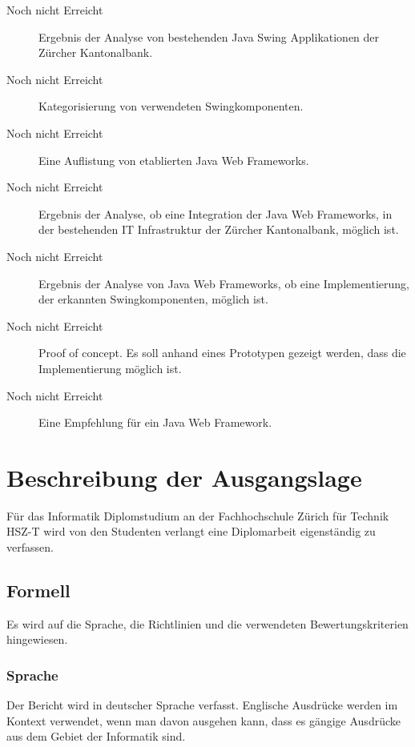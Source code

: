 \documentclass[
11pt, %
a4paper, %
BCOR25mm, %
DIV14, %
footsepline = false, %
headsepline, %
twoside, %
openright,
abstracton, %
listof=totocnumbered, %
bibliography=totocnumbered %
]{scrreprt}
\begin{document}
  \begin{description}
    \item [Noch nicht Erreicht] Ergebnis der Analyse von bestehenden Java Swing
    Applikationen der Zürcher Kantonalbank.
    \item [Noch nicht Erreicht] Kategorisierung von verwendeten
    Swingkomponenten.
    \item [Noch nicht Erreicht] Eine Auflistung von etablierten Java Web
    Frameworks.
    \item [Noch nicht Erreicht] Ergebnis der Analyse, ob eine Integration der
    Java Web Frameworks, in der bestehenden IT Infrastruktur der Zürcher
    Kantonalbank, möglich ist.
    \item [Noch nicht Erreicht] Ergebnis der Analyse von Java Web Frameworks, ob
    eine Implementierung, der erkannten Swingkomponenten, möglich ist.
    \item [Noch nicht Erreicht] Proof of concept. Es soll anhand eines
    Prototypen gezeigt werden, dass die Implementierung möglich ist.
    \item [Noch nicht Erreicht] Eine Empfehlung für ein Java Web Framework.
  \end{description}
  
  
  \chapter{Beschreibung der Ausgangslage}
  
  Für das Informatik Diplomstudium an der Fachhochschule Zürich für Technik
  HSZ-T wird von den Studenten verlangt eine Diplomarbeit eigenständig zu
  verfassen.
  
  \section{Formell}
  
  Es wird auf die Sprache, die Richtlinien und die verwendeten
  Bewertungskriterien hingewiesen.
  
  \subsection{Sprache}
  
  Der Bericht wird in deutscher Sprache verfasst. Englische Ausdrücke werden im
  Kontext verwendet, wenn man davon ausgehen kann, dass es gängige Ausdrücke aus
  dem Gebiet der Informatik sind.
    
\end{document}
